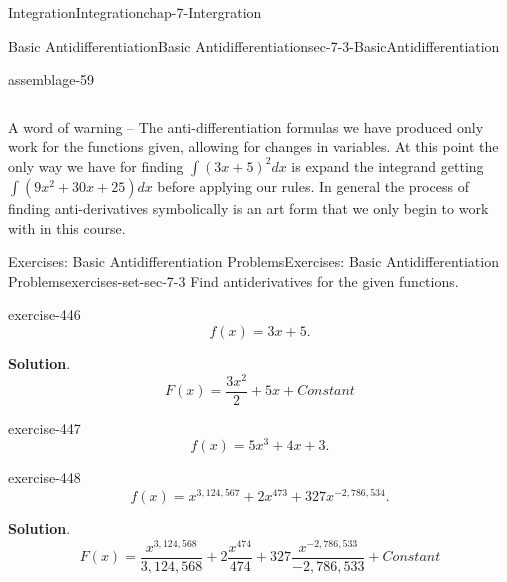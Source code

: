 \documentclass[oneside,10pt,]{book}
\numberwithin{equation}{section}
\begin{document}
\begin{chapterptx}{Integration}{}{Integration}{}{}{chap-7-Intergration}
\begin{sectionptx}{Basic Antidifferentiation}{}{Basic Antidifferentiation}{}{}{sec-7-3-BasicAntidifferentiation}
\begin{assemblage}{}{assemblage-59}
\begin{sidebyside}{1}{0}{0}{0}
\begin{sbspanel}{1}
{\begin{tabular}{cc}
\end{tabular}
\par}
\end{sbspanel}%
\end{sidebyside}%
\end{assemblage}
\hypertarget{p-2788}{}%
A word of warning – The anti-differentiation formulas we have produced only work for the functions given, allowing for changes in variables.  At this point the only way we have for finding  \(\int(3x+5)^2 dx\) is expand the integrand getting  \(\int(9x^2+30x+25)dx\) before applying our rules.  In general the process of finding anti-derivatives symbolically is an art form that we only begin to work with in this course.%
%
%
\typeout{************************************************}
\typeout{************************************************}
%
\begin{exercises-subsection-numberless}{Exercises: Basic Antidifferentiation Problems}{}{Exercises: Basic Antidifferentiation Problems}{}{}{exercises-set-sec-7-3}
\hypertarget{p-2789}{}%
Find antiderivatives for the given functions.%
\begin{divisionexercise}{1}{}{}{exercise-446}%
%
\begin{equation*}
f(x)=3x+5.
\end{equation*}
\par\smallskip%
\noindent\textbf{Solution}.\hypertarget{solution-226}{}\quad%
%
\begin{equation*}
F(x)=\frac{3x^2}{2}+5x+Constant
\end{equation*}
\end{divisionexercise}%
\begin{divisionexercise}{2}{}{}{exercise-447}%
%
\begin{equation*}
f(x)=5x^3+4x+3.
\end{equation*}
\end{divisionexercise}%
\begin{divisionexercise}{3}{}{}{exercise-448}%
%
\begin{equation*}
f(x)=x^{3,124,567}+2x^{473}+327 x^{-2,786,534}.
\end{equation*}
\par\smallskip%
\noindent\textbf{Solution}.\hypertarget{solution-227}{}\quad%
%
\begin{equation*}
F(x)=\frac{x^{3,124,568}}{3,124,568}+2 \frac{x^{474}}{474}+327 \frac{x^{-2,786,533}}{-2,786,533}+Constant
\end{equation*}

\end{divisionexercise}
\end{exercises-subsection-numberless}
\end{sectionptx}
\end{chapterptx}
\end{document}
